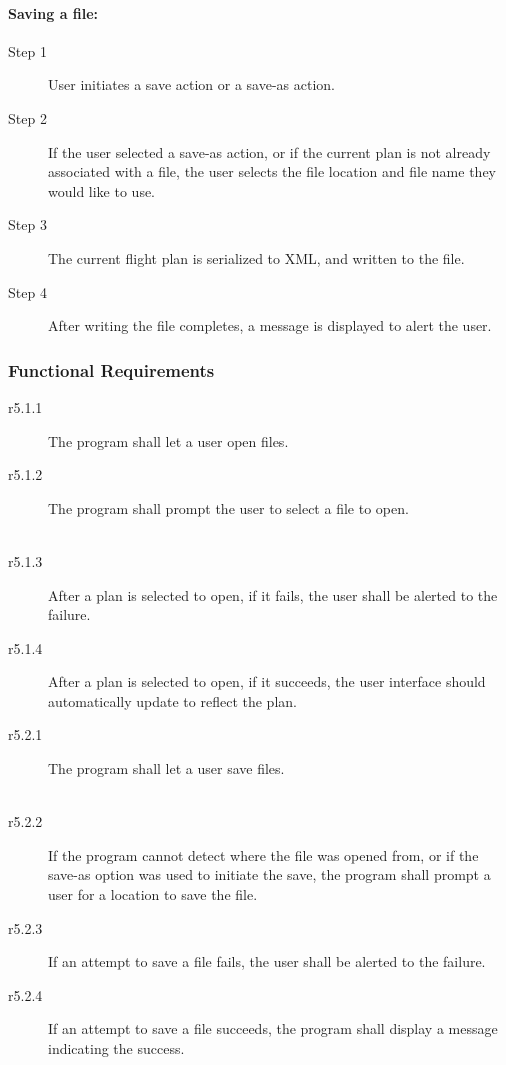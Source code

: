 \documentclass[12pt, letterpaper]{article}
\begin{document}
            \paragraph{Saving a file:}
            \begin{description}
              \item[Step 1] User initiates a save action or a save-as action.
              \item[Step 2] If the user selected a save-as action, or if the current plan is not already associated with a file,
                the user selects the file location and file name they would like to use.
              \item[Step 3] The current flight plan is serialized to XML, and written to the file.
              \item[Step 4] After writing the file completes, a message is displayed to alert the user.
            \end{description}
          \subsubsection{Functional Requirements}
            \begin{description}
              \item[r5.1.1] The program shall let a user open files. \\
              \item[r5.1.2] The program shall prompt the user to select a file to open. \\ \
              \item[r5.1.3] After a plan is selected to open, if it fails, the user shall be alerted to the failure. \\
              \item[r5.1.4] After a plan is selected to open, if it succeeds, the user interface should automatically update to reflect the plan. \\
              \item[r5.2.1] The program shall let a user save files. \\ \
              \item[r5.2.2] If the program cannot detect where the file was opened from,
                         or if the save-as option was used to initiate the save, the program shall prompt a user for a location to save the file. \\
              \item[r5.2.3] If an attempt to save a file fails, the user shall be alerted to the failure. \\
              \item[r5.2.4] If an attempt to save a file succeeds, the program shall display a message indicating the success. \\
            \end{description}
          \newpage
\end{document}
